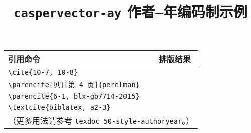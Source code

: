 \documentclass[UTF8]{ctexart}
\begin{document}
\title{\textbf{\texttt{caspervector-ay} 作者--年编码制示例}}
\author{}
\date{}
\maketitle
\vspace*{-1em}

\begin{center}
\begin{tabular}{ll}\hline
引用命令 &	排版结果 \\\hline
\verb|\cite{10-7, 10-8}| &	\cite{10-7, 10-8} \\
\verb|\parencite[见][第 4 页]{perelman}| &	\parencite[见][第 4 页]{perelman} \\
\verb|\parencite{6-1, blx-gb7714-2015}| &	\parencite{6-1, blx-gb7714-2015} \\
\verb|\textcite{biblatex, a2-3}| &	\textcite{biblatex, a2-3} \\\hline
\multicolumn{2}{l}{（更多用法请参考 \texttt{texdoc 50-style-authoryear}。）} \\
\end{tabular}
\end{center}

\printbibliography[category = cited, title = {本文参考文献}]
\printbibliography[notcategory = cited, title = {%
	其它参考文献示例
	（引自\texorpdfstring{文献 \parencite{gbt7714-2005}}{ GB/T 7714-2005}）%
}]
\nocite{*}
\end{document}
